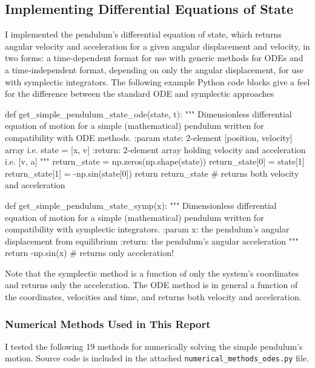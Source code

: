 \documentclass[11pt, a4paper]{article}
\begin{document}
 
\subsection{Implementing Differential Equations of State} \label{newton:ss:eq-state}
I implemented the pendulum's differential equation of state, which returns angular velocity and acceleration for a given angular displacement and velocity, in two forms: a time-dependent format for use with generic methods for ODEs and a time-independent format, depending on only the angular displacement, for use with symplectic integrators. The following example Python code blocks give a feel for the difference between the standard ODE and symplectic approaches
\begin{python}
def get_simple_pendulum_state_ode(state, t):
    """ 
    Dimensionless differential equation of motion for a simple (mathematical) pendulum written for compatibility with ODE methods.
    :param state: 2-element [position, velocity] array i.e. state = [x, v]
    :return: 2-element array holding velocity and acceleration i.e. [v, a]
    """
    return_state = np.zeros(np.shape(state))
    return_state[0] = state[1]
    return_state[1] = -np.sin(state[0])
    return return_state  # returns both velocity and acceleration
\end{python}

\begin{python}
def get_simple_pendulum_state_symp(x):
    """
    Dimensionless differential equation of motion for a simple (mathematical) pendulum written for compatibility with symplectic integrators.
    :param x: the pendulum's angular displacement from equilibrium
    :return: the pendulum's angular acceleration
    """
    return -np.sin(x)  # returns only acceleration!

\end{python}
Note that the symplectic method is a function of only the system's coordinates and returns only the acceleration. The ODE method is in general a function of the coordinates, velocities and time, and returns both velocity and acceleration.


\subsubsection{Numerical Methods Used in This Report}
I tested the following 19 methods for numerically solving the simple pendulum's motion. Source code is included in the attached \texttt{numerical\_methods\_odes.py} file. 
\end{document}
